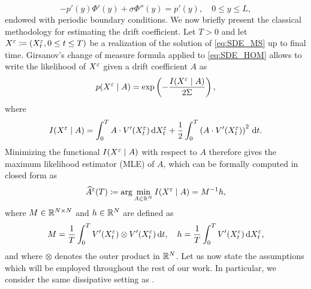 \documentclass[10pt]{article}
\begin{document}
\begin{equation}\label{eq:CellProblem}
	-p'(y)\Phi'(y) + \sigma \Phi''(y) = p'(y), \quad 0 \leq y \leq L,
\end{equation}
endowed with periodic boundary conditions. 
We now briefly present the classical methodology for estimating the drift coefficient. Let $T > 0$ and let $X^\varepsilon \coloneqq (X^\varepsilon_t, 0\leq t \leq T)$ be a realization of the solution of \eqref{eq:SDE_MS} up to final time. Girsanov's change of measure formula applied to \eqref{eq:SDE_HOM} allows to write the likelihood of $X^\varepsilon$ given a drift coefficient $A$ as
\begin{equation}\label{eq:Likelihood}
p(X^\varepsilon \mid A) = \exp\left(-\frac{I(X^\varepsilon\mid A)}{2\Sigma} \right), 
\end{equation}
where 
\begin{equation}
I(X^\varepsilon \mid A) = \int_0^T A \cdot V'(X^\varepsilon_t) \,\mathrm{d} X^\varepsilon_t + \frac12 \int_0^T \left( A \cdot V'(X^\varepsilon_t) \right)^2 \,\mathrm{d} t.
\end{equation}
Minimizing the functional $I(X^\varepsilon \mid A)$ with respect to $A$ therefore gives the maximum likelihood estimator (MLE) of $A$, which can be formally computed in closed form as
\begin{equation}\label{eq:MLE}
	\widehat A^\varepsilon(T) \coloneqq \arg \min_{A \in \mathbb{R}^N} I(X^\varepsilon \mid A) = M^{-1}h,
\end{equation}
where $M\in\mathbb{R}^{N\times N}$ and $h\in\mathbb{R}^N$ are defined as
\begin{equation}\label{eq:MandH}
M = \frac1T \int_0^T V'(X^\varepsilon_t) \otimes V'(X^\varepsilon_t) \,\mathrm{d} t, \quad h = \frac1T \int_0^T V'(X^\varepsilon_t) \,\mathrm{d} X^\varepsilon_t,
\end{equation}
and where $\otimes$ denotes the outer product in $\mathbb{R}^N$. Let us now state the assumptions which will be employed throughout the rest of our work. In particular, we consider the same dissipative setting as \cite[Assumption 3.1]{PaS07}.
\end{document}
